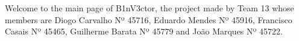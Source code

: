 Welcome to the main page of B1n\+V3ctor, the project made by {\ttfamily Team 13} whose members are Diogo Carvalho Nº 45716, Eduardo Mendes Nº 45916, Francisco Casais Nº 45465, Guilherme Barata Nº 45779 and João Marques Nº 45722. 